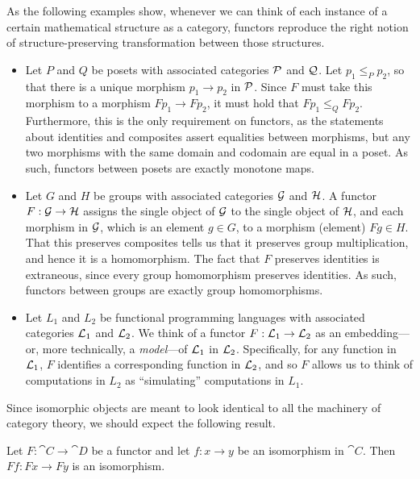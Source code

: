 \begin{ex}
  As the following examples show, whenever we can think of each instance of a
  certain mathematical structure as a category, functors reproduce the right
  notion of structure-preserving transformation between those structures.
  \begin{itemize}
    \item Let $P$ and $Q$ be posets with associated categories $\mathcal{P}$ and $\mathcal{Q}$. Let
      $p_1\leq_P p_2$, so that there is a unique morphism $p_1\to p_2$ in $\mathcal{P}$. Since
      $F$ must take this morphism to a morphism $Fp_1\to Fp_2$, it must hold that
      $Fp_1\leq_Q Fp_2$. Furthermore, this is the only requirement on functors, as
      the statements about identities and composites assert equalities between
      morphisms, but any two morphisms with the same domain and codomain are equal
      in a poset. As such, functors between posets are exactly monotone maps.
    \item Let $G$ and $H$ be groups with associated categories $\mathcal{G}$ and
      $\mathcal{H}$. A functor $F: \mathcal{G}\to\mathcal{H}$ assigns the single object of $\mathcal{G}$ to the
      single object of $\mathcal{H}$, and each morphism in $\mathcal{G}$, which is an element $g\in
      G$, to a morphism (element) $Fg\in H$. That this preserves composites tells us
      that it preserves group multiplication, and hence it is a homomorphism. The
      fact that $F$ preserves identities is extraneous, since every group
      homomorphism preserves identities. As such, functors between groups are exactly
      group homomorphisms.
    \item Let $L_1$ and $L_2$ be functional programming languages with associated
      categories $\mathcal{L}_1$ and $\mathcal{L}_2$. We think of a functor $F: \mathcal{L}_1\to\mathcal{L}_2$ as an
      embedding---or, more technically, a \emph{model}---of $\mathcal{L}_1$ in $\mathcal{L}_2$.
      Specifically, for any function in $\mathcal{L}_1$, $F$ identifies a corresponding
      function in $\mathcal{L}_2$, and so $F$ allows us to think of computations in $L_2$ as
      ``simulating'' computations in $L_1$.
  \end{itemize}
\end{ex}

Since isomorphic objects are meant to look identical to all the machinery of
category theory, we should expect the following result.

\begin{prop}
  Let $F: \cat{C}\to\cat{D}$ be a functor and let $f: x\to y$ be an isomorphism
  in $\cat{C}$. Then $Ff: Fx\to Fy$ is an isomorphism.
\end{prop}

